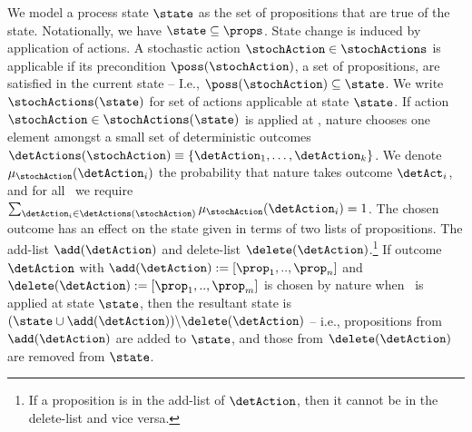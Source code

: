 \documentclass[letterpaper]{article}
\begin{document}
We model a process state $\state$ as the set of propositions that are
true of the state. Notationally, we have $\state \subseteq
\props$. State change is induced by application of actions. A
stochastic action $\stochAction \in \stochActions$ is applicable if
its precondition $\poss(\stochAction)$, a set of propositions, are
satisfied in the current state -- I.e., $\poss(\stochAction) \subseteq
\state$. We write $\stochActions(\state)$ for set of actions
applicable at state $\state$.  If action $\stochAction \in
\stochActions(\state)$ is applied at \state, nature chooses one
element amongst a small set of deterministic outcomes
$\detActions(\stochAction) \equiv \{\detAction_1, \ldots, \detAction_k
\}$. We denote $\mu_{\stochAction}(\detAction_i)$ the probability that
nature takes outcome $\detAct_i$, and for all \stochAction\ we require
$\sum_{\detAction_i \in \detActions(\stochAction)}
\mu_{\stochAction}(\detAction_i) = 1$. The chosen outcome has an
effect on the state given in terms of two lists of propositions. The
add-list $\add(\detAction)$ and delete-list
$\delete(\detAction)$.\footnote{If a proposition is in the add-list of
$\detAction$, then it cannot be in the delete-list and vice versa.}
If outcome $\detAction$ with $\add(\detAction) := [\prop_1,
..,\prop_n]$ and $\delete(\detAction) := [\prop_1, ..,\prop_m]$ is
chosen by nature when \stochAction\ is applied at state $\state$, then
the resultant state is $ ( \state \cup \add(\detAction) ) \backslash
\delete(\detAction)$ -- i.e., propositions from $\add(\detAction)$ are
added to $\state$, and those from $\delete(\detAction)$ are removed
from $\state$.
\end{document}
